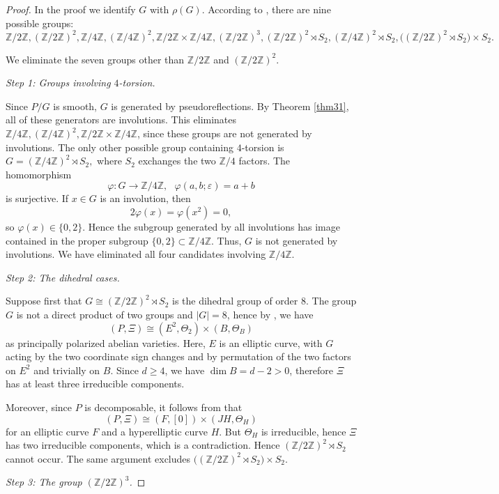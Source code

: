\documentclass[10pt,a4paper]{amsart}
\numberwithin{equation}{section}
\newcommand{\ZZ}{\mathbb Z}
\newcommand{\eps}{\varepsilon}
\begin{document}
\begin{proof}
In the proof we identify $G$ with $\rho(G)$. According to \cite[Proposition 5.1]{ALN}, there are nine possible groups: $$\ZZ/2\ZZ, (\ZZ/2\ZZ)^2, \ZZ/4\ZZ, (\ZZ/4\ZZ)^2, \ZZ/2\ZZ \times \ZZ/4\ZZ, (\ZZ/2\ZZ)^3, (\ZZ/2\ZZ)^2\rtimes S_2, (\ZZ/4\ZZ)^2\rtimes S_2, \bigl((\ZZ/2\ZZ)^2\rtimes S_2\bigr)\times S_2.$$

We eliminate the seven groups other than $\ZZ/2\ZZ$ and $(\ZZ/2\ZZ)^2$.

\medskip
\noindent\textit{Step 1: Groups involving $4$-torsion.}

Since $P/G$ is smooth, $G$ is generated by pseudoreflections. By Theorem \ref{thm31}, all of these generators are involutions. This eliminates $\ZZ/4\ZZ, (\ZZ/4\ZZ)^2, \ZZ/2\ZZ\times \ZZ/4\ZZ$, since these groups are not generated by involutions. The only other possible group containing $4$-torsion is 
$G=(\ZZ/4\ZZ)^2\rtimes S_2,$ where $S_2$ exchanges the two $\ZZ/4$ factors. The homomorphism
$$\varphi\colon G\longrightarrow\ZZ/4\ZZ, \ \ \  \varphi(a,b;\eps)=a+b$$
is surjective. If $x\in G$ is an involution, then
\[
2\varphi(x)=\varphi(x^2)=0,
\]
so $\varphi(x)\in\{0,2\}$. Hence the subgroup generated by all involutions has image contained in the proper subgroup $\{0,2\}\subset\ZZ/4\ZZ$. Thus, $G$ is not generated by involutions. We have eliminated all four candidates involving $\ZZ/4\ZZ$.

\medskip
\noindent\textit{Step 2: The dihedral cases.}

Suppose first that $G\cong (\ZZ/2\ZZ)^2\rtimes S_2$ is the dihedral group of order 8. The group $G$ is not a direct product of two groups and $|G| = 8$, hence by \cite[Theorem 3.5]{ALA}, we have $$(P,\Xi)\cong(E^2,\Theta_2)\times(B,\Theta_B)$$ as principally polarized abelian varieties. Here, $E$ is an elliptic curve, with $G$ acting by the two coordinate sign changes and by permutation of the two factors on $E^2$ and trivially on $B$. Since $d\geq4$, we have $\dim B=d-2>0$, therefore $\Xi$ has at least three irreducible components.

Moreover, since $P$ is decomposable, it follows from \cite[Remark 4.2]{ALN} that
$$(P,\Xi)\cong(F,[0])\times(JH,\Theta_H)$$ for an elliptic curve $F$ and a hyperelliptic curve $H$. But $\Theta_H$ is irreducible, hence $\Xi$ has two irreducible components, which is a contradiction. Hence $(\ZZ/2\ZZ)^2\rtimes S_2$ cannot occur. The same argument excludes $\bigl((\ZZ/2\ZZ)^2\rtimes S_2\bigr)\times S_2$.

\medskip
\noindent\textit{Step 3: The group $(\ZZ/2\ZZ)^3$.}


\end{proof}
\end{document}
